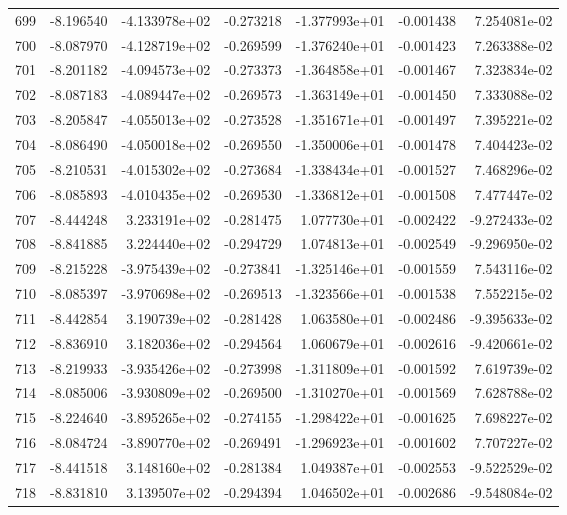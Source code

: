 \begin{tabular}{rrrrrrr}
 699 &  -8.196540 & -4.133978e+02 & -0.273218 & -1.377993e+01 &   -0.001438 &  7.254081e-02 \\
 700 &  -8.087970 & -4.128719e+02 & -0.269599 & -1.376240e+01 &   -0.001423 &  7.263388e-02 \\
 701 &  -8.201182 & -4.094573e+02 & -0.273373 & -1.364858e+01 &   -0.001467 &  7.323834e-02 \\
 702 &  -8.087183 & -4.089447e+02 & -0.269573 & -1.363149e+01 &   -0.001450 &  7.333088e-02 \\
 703 &  -8.205847 & -4.055013e+02 & -0.273528 & -1.351671e+01 &   -0.001497 &  7.395221e-02 \\
 704 &  -8.086490 & -4.050018e+02 & -0.269550 & -1.350006e+01 &   -0.001478 &  7.404423e-02 \\
 705 &  -8.210531 & -4.015302e+02 & -0.273684 & -1.338434e+01 &   -0.001527 &  7.468296e-02 \\
 706 &  -8.085893 & -4.010435e+02 & -0.269530 & -1.336812e+01 &   -0.001508 &  7.477447e-02 \\
 707 &  -8.444248 &  3.233191e+02 & -0.281475 &  1.077730e+01 &   -0.002422 & -9.272433e-02 \\
 708 &  -8.841885 &  3.224440e+02 & -0.294729 &  1.074813e+01 &   -0.002549 & -9.296950e-02 \\
 709 &  -8.215228 & -3.975439e+02 & -0.273841 & -1.325146e+01 &   -0.001559 &  7.543116e-02 \\
 710 &  -8.085397 & -3.970698e+02 & -0.269513 & -1.323566e+01 &   -0.001538 &  7.552215e-02 \\
 711 &  -8.442854 &  3.190739e+02 & -0.281428 &  1.063580e+01 &   -0.002486 & -9.395633e-02 \\
 712 &  -8.836910 &  3.182036e+02 & -0.294564 &  1.060679e+01 &   -0.002616 & -9.420661e-02 \\
 713 &  -8.219933 & -3.935426e+02 & -0.273998 & -1.311809e+01 &   -0.001592 &  7.619739e-02 \\
 714 &  -8.085006 & -3.930809e+02 & -0.269500 & -1.310270e+01 &   -0.001569 &  7.628788e-02 \\
 715 &  -8.224640 & -3.895265e+02 & -0.274155 & -1.298422e+01 &   -0.001625 &  7.698227e-02 \\
 716 &  -8.084724 & -3.890770e+02 & -0.269491 & -1.296923e+01 &   -0.001602 &  7.707227e-02 \\
 717 &  -8.441518 &  3.148160e+02 & -0.281384 &  1.049387e+01 &   -0.002553 & -9.522529e-02 \\
 718 &  -8.831810 &  3.139507e+02 & -0.294394 &  1.046502e+01 &   -0.002686 & -9.548084e-02 \\

\end{tabular}
